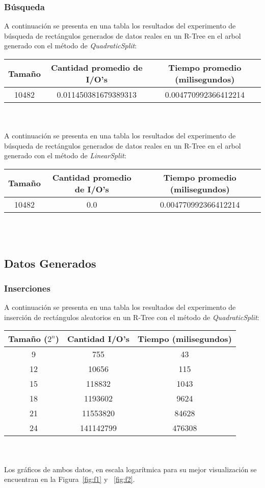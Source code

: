 \documentclass[letterpaper,12pt]{article}
\begin{document}
\subsubsection{Búsqueda}
A continuaci\'on se presenta en una tabla los resultados del experimento de búsqueda de rect\'angulos generados de datos reales en un R-Tree en el arbol generado con el m\'etodo de \textit{QuadraticSplit}: \\
\begin{tabular}{|c|c|c|}
\hline
\textbf{Tama\~no} & \textbf{Cantidad promedio de I/O's} & \textbf{Tiempo promedio (milisegundos)} \\
\hline
10482 & 0.011450381679389313 & 0.004770992366412214 \\
\hline
\end{tabular}
\\ \\

A continuaci\'on se presenta en una tabla los resultados del experimento de búsqueda de rect\'angulos generados de datos reales en un R-Tree en el arbol generado con el m\'etodo de \textit{LinearSplit}: \\
\begin{tabular}{|c|c|c|}
\hline
\textbf{Tama\~no} & \textbf{Cantidad promedio de I/O's} & \textbf{Tiempo promedio (milisegundos)} \\
\hline
10482 & 0.0 & 0.004770992366412214 \\
\hline
\end{tabular}
\\ \\

\subsection{Datos Generados}
\subsubsection{Inserciones}
A continuación se presenta en una tabla los resultados del experimento de inserción de rectángulos aleatorios en un R-Tree con el método de \textit{QuadraticSplit}: \\
\begin{tabular}{|c|c|c|}
\hline
\textbf{Tama\~no ($2^n$)} & \textbf{Cantidad I/O's} & \textbf{Tiempo (milisegundos)} \\
\hline
9 & 755 & 43 \\
\hline
12 & 10656 & 115 \\
\hline
15 & 118832 & 1043 \\
\hline
18 & 1193602 & 9624 \\
\hline
21 & 11553820 & 84628 \\
\hline
24 & 141142799 & 476308 \\
\hline
\end{tabular}
\\ \\
Los gr\'aficos de ambos datos, en escala logar\'itmica para su mejor visualizaci\'on se encuentran en la Figura~\ref{fig:f1} y ~\ref{fig:f2}.
\end{document}
